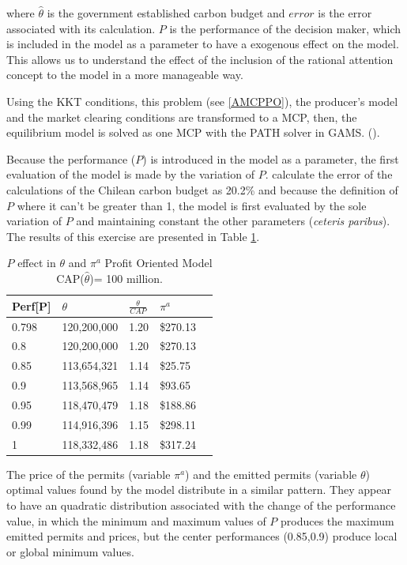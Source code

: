 \documentclass[a4paper,fleqn]{cas-dc}
\begin{document}
where $\hat{\theta}$ is the government established carbon budget and $error$ is the error associated with its calculation. $P$ is the performance of the decision maker, which is included in the model as a parameter to have a exogenous effect on the model. This allows us to understand the effect of the inclusion of the rational attention concept to the model in a more manageable way.

Using the KKT conditions, this problem (see \ref{AMCPPO}), the producer's model and the market clearing conditions are transformed to a MCP, then, the equilibrium model is solved as one MCP with the PATH solver in GAMS. (\cite{ferris_complementarity_2000}). 

Because the performance ($P$) is introduced in the model as a parameter, the first evaluation of the model is made by the variation of $P$. \cite{andres_new_2014} calculate the error of the calculations of the Chilean carbon budget as 20.2\% and because the definition of $P$ where it can't be greater than 1, the model is first evaluated by the sole variation of $P$ and maintaining constant the other parameters (\textit{ceteris paribus}). The results of this exercise are presented in Table \ref{efectopenthetapia}.


\begin{table}[H]
    \caption{{\footnotesize $P$ effect in $\theta$ and $\pi^a$ Profit Oriented Model  CAP($\hat{\theta}$)= 100 million.}}
    \label{efectopenthetapia}
    \centering
    \begin{tabular}{ l l l l l }
    \hline
        Perf[P]  & $\theta$  & $\frac{\theta}{CAP}$  & $\pi^a$  \\ \hline
        0.798   & 120,200,000 & 1.20  &  \$270.13   \\ \hline
        0.8  & 120,200,000 & 1.20  &  \$270.13   \\ \hline
        0.85  & 113,654,321 & 1.14  &  \$25.75   \\ \hline
        0.9 & 113,568,965 & 1.14  &  \$93.65   \\ \hline
        0.95  & 118,470,479 & 1.18  &  \$188.86   \\ \hline
        0.99 & 114,916,396 & 1.15  &  \$298.11   \\ \hline
        1  & 118,332,486 & 1.18  &  \$317.24   \\ \hline
    \end{tabular}
\end{table}

The price of the permits (variable $\pi^a$) and the emitted permits (variable $\theta$) optimal values found by the model distribute in a similar pattern. They appear to have an quadratic distribution associated with the change of the performance value, in which the minimum and maximum values of $P$ produces the maximum emitted permits and prices, but the center performances (0.85,0.9) produce local or global minimum values.
\end{document}
